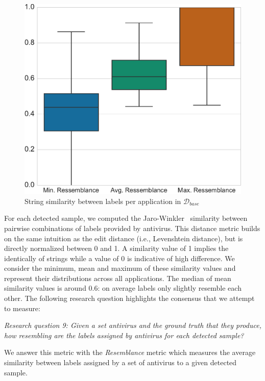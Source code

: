 \begin{figure}[!ht]
        \centering
	\includegraphics[width=0.75\linewidth]{figures/stase/resemblance.pdf}
        \caption[String similarity between antivirus labels per application]{String similarity between labels per application in $\mathcal{D}_{base}$}
	\label{figure:stase:conventionality}
\end{figure}

For each detected sample, we computed the Jaro-Winkler~\cite{cohen_comparison_2003} similarity between pairwise combinations of labels provided by antivirus.
This distance metric builds on the same intuition as the edit distance (i.e., Levenshtein distance), but is directly normalized between 0 and 1.
A similarity value of 1 implies the identically of strings while a value of 0 is indicative of high difference.
We consider the minimum, mean and maximum of these similarity values and represent their distributions across all applications.
The median of mean similarity values is around 0.6: on average labels only slightly resemble each other.
The following research question highlights the consensus that we attempt to measure:

\begin{mdframed}[roundcorner=10pt,nobreak]
	{\em Research question 9: Given a set antivirus and the ground truth that they produce, how resembling are the labels assigned by antivirus for each detected sample?}
\end{mdframed}

We answer this metric with the \emph{Resemblance} metric which measures the average similarity between labels assigned by a set of antivirus to a given detected sample.

